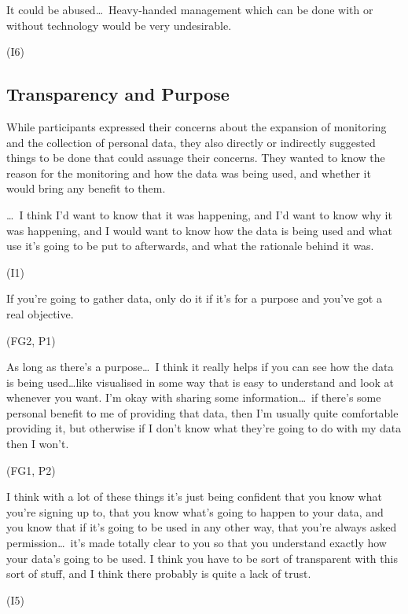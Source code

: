 \begin{qt}It could be abused\ldots\  Heavy-handed management which can
  be done with or without technology would be very
  undesirable.\end{qt} (I6) 

\subsection{Transparency and Purpose}
\label{sec:making-monit-accept}

While participants expressed their concerns about the expansion of
monitoring and the collection of personal data, they also directly or
indirectly suggested things to be done that could assuage their
concerns. They wanted to know the reason for the monitoring and how
the data was being used, and whether it would bring any benefit to
them.

\begin{qt} \ldots\  I think I’d want to know
that it was happening, and I’d want to know why it was happening, and
I would want to know how the data is being used and what use it’s
going to be put to afterwards, and what the rationale behind it was.\end{qt} (I1)

\begin{qt}If you’re going to gather data, only do it if it’s for a
  purpose and you’ve got a real objective.\end{qt} (FG2, P1)
 
\begin{qt}As long as there’s a purpose\ldots\  I think it really helps if you can see how the data is being used…like visualised in some way that is easy to understand and look at whenever you want. I’m okay with sharing some information\ldots\  if there’s some personal benefit to me of providing that data, then I’m usually quite comfortable providing it, but otherwise if I don’t know what they’re going to do with my data then I won’t.\end{qt}(FG1, P2)

\begin{qt}I think with a lot of these things it’s just being confident that you
know what you’re signing up to, that you know what’s going to happen
to your data, and you know that if it’s going to be used in any other
way, that you’re always asked permission\ldots\  it’s made totally clear to
you so that you understand exactly how your data’s going to be used. I
think you have to be sort of transparent with this sort of stuff, and
I think there probably is quite a lack of trust.\end{qt} (I5)

